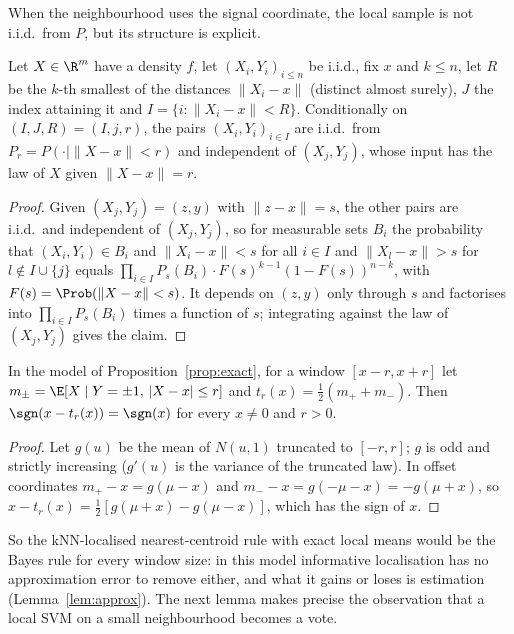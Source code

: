 When the neighbourhood uses the signal coordinate, the local sample is not i.i.d.\ from $P$, but its structure is explicit.

\begin{lemma}\label{lem:radius}
Let $X\in\R^m$ have a density $f$, let $(X_i,Y_i)_{i\le n}$ be i.i.d., fix $x$ and $k\le n$, let $R$ be the $k$-th smallest of the distances $\|X_i-x\|$ (distinct almost surely), $J$ the index attaining it and $I=\{i:\|X_i-x\|<R\}$. Conditionally on $(I,J,R)=(I,j,r)$, the pairs $(X_i,Y_i)_{i\in I}$ are i.i.d.\ from $P_r=P(\cdot\mid\|X-x\|<r)$ and independent of $(X_j,Y_j)$, whose input has the law of $X$ given $\|X-x\|=r$.
\end{lemma}
\begin{proof}
Given $(X_j,Y_j)=(z,y)$ with $\|z-x\|=s$, the other pairs are i.i.d.\ and independent of $(X_j,Y_j)$, so for measurable sets $B_i$ the probability that $(X_i,Y_i)\in B_i$ and $\|X_i-x\|<s$ for all $i\in I$ and $\|X_l-x\|>s$ for $l\notin I\cup\{j\}$ equals $\prod_{i\in I}P_s(B_i)\cdot F(s)^{k-1}(1-F(s))^{n-k}$, with $F(s)=\Prob(\|X-x\|<s)$. It depends on $(z,y)$ only through $s$ and factorises into $\prod_{i\in I}P_s(B_i)$ times a function of $s$; integrating against the law of $(X_j,Y_j)$ gives the claim.
\end{proof}

\begin{lemma}\label{lem:popsign}
In the model of Proposition~\ref{prop:exact}, for a window $[x-r,x+r]$ let $m_\pm=\E[X\mid Y=\pm1,\,|X-x|\le r]$ and $t_r(x)=\tfrac12(m_++m_-)$. Then $\sgn(x-t_r(x))=\sgn(x)$ for every $x\neq0$ and $r>0$.
\end{lemma}
\begin{proof}
Let $g(u)$ be the mean of $N(u,1)$ truncated to $[-r,r]$; $g$ is odd and strictly increasing ($g'(u)$ is the variance of the truncated law). In offset coordinates $m_+-x=g(\mu-x)$ and $m_--x=g(-\mu-x)=-g(\mu+x)$, so $x-t_r(x)=\tfrac12[g(\mu+x)-g(\mu-x)]$, which has the sign of $x$.
\end{proof}

So the kNN-localised nearest-centroid rule with exact local means would be the Bayes rule for every window size: in this model informative localisation has no approximation error to remove either, and what it gains or loses is estimation (Lemma~\ref{lem:approx}). The next lemma makes precise the observation that a local SVM on a small neighbourhood becomes a vote.

